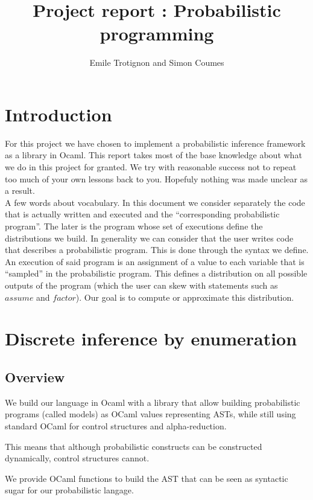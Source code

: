\documentclass{article}
\title{Project report : Probabilistic programming}
\author{Emile Trotignon and Simon Coumes}
\begin{document}
\maketitle

\section{Introduction}

For this project we have chosen to implement a probabilistic inference framework as a library in Ocaml.
This report takes most of the base knowledge about what we do in this project for granted.
We try with reasonable success not to repeat too much of your own lessons back to you.
Hopefuly nothing was made unclear as a result. \\

A few words about vocabulary.
In this document we consider separately the code that is actually written and executed and the ``corresponding probabilistic program''.
The later is the program whose set of executions define the distributions we build.
In generality we can consider that the user writes code that describes a probabilistic program.
This is done through the syntax we define.
An execution of said program is an assignment of a value to each variable that is ``sampled'' in the probabilistic program.
This defines a distribution on all possible outputs of the program (which the user can skew with statements such as $assume$ and $factor$). Our goal is to compute or approximate this distribution.

\section{Discrete inference by enumeration}

\subsection{Overview}

We build our language in Ocaml with a library that allow building probabilistic
programs (called models) as OCaml values representing ASTs, while still using
standard OCaml for control structures and alpha-reduction.

This means that although probabilistic constructs can be constructed dynamically,
control structures cannot.

We provide OCaml functions to build the AST that can be seen as syntactic sugar
for our probabilistic langage.
\end{document}
